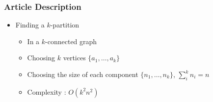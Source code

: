 \begin{frame}
  \frametitle{Article Description}
  \begin{itemize}
  \item Finding a $k$-partition
    \begin{itemize}
    \item In a $k$-connected graph
    \item Choosing $k$ vertices $\{a_1, \dots , a_k\}$
    \item Choosing the size of each component $\{n_1, \dots ,n_k\}$,
      $\sum\limits_{i}^k{n_i} = n$
    \item Complexity : $O(k^2 n^2)$
    \end{itemize}
  \end{itemize}
\end{frame}


